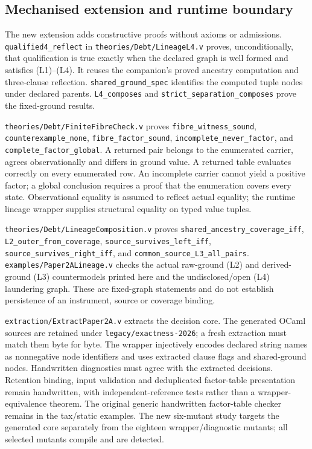 \documentclass[11pt]{article}
\theoremstyle{definition}
\newcommand{\code}[1]{\texttt{#1}}
\begin{document}
\subsection{Mechanised extension and runtime boundary}\label{ex:app:mechanisation}
The new extension adds constructive proofs without axioms or admissions. \code{qualified4\_reflect} in \nolinkurl{theories/Debt/LineageL4.v} proves, unconditionally, that qualification is true exactly when the declared graph is well formed and satisfies (L1)--(L4). It reuses the companion's proved ancestry computation and three-clause reflection. \code{shared\_ground\_spec} identifies the computed tuple nodes under declared parents. \code{L4\_composes} and \code{strict\_separation\_composes} prove the fixed-ground results.

\nolinkurl{theories/Debt/FiniteFibreCheck.v} proves \code{fibre\_witness\_sound}, \code{counterexample\_none}, \code{fibre\_factor\_sound}, \code{incomplete\_never\_factor}, and \code{complete\_factor\_global}. A returned pair belongs to the enumerated carrier, agrees observationally and differs in ground value. A returned table evaluates correctly on every enumerated row. An incomplete carrier cannot yield a positive factor; a global conclusion requires a proof that the enumeration covers every state. Observational equality is assumed to reflect actual equality; the runtime lineage wrapper supplies structural equality on typed value tuples.

\nolinkurl{theories/Debt/LineageComposition.v} proves \code{shared\_ancestry\_coverage\_iff}, \code{L2\_outer\_from\_coverage}, \code{source\_survives\_left\_iff}, \code{source\_survives\_right\_iff}, and \code{common\_source\_L3\_all\_pairs}. \nolinkurl{examples/Paper2ALineage.v} checks the actual raw-ground (L2) and derived-ground (L3) countermodels printed here and the undisclosed/open (L4) laundering graph. These are fixed-graph statements and do not establish persistence of an instrument, source or coverage binding.

\nolinkurl{extraction/ExtractPaper2A.v} extracts the decision core. The generated OCaml sources are retained under \nolinkurl{legacy/exactness-2026}; a fresh extraction must match them byte for byte. The wrapper injectively encodes declared string names as nonnegative node identifiers and uses extracted clause flags and shared-ground nodes. Handwritten diagnostics must agree with the extracted decisions. Retention binding, input validation and deduplicated factor-table presentation remain handwritten, with independent-reference tests rather than a wrapper-equivalence theorem. The original generic handwritten factor-table checker remains in the tax/static examples. The new six-mutant study targets the generated core separately from the eighteen wrapper/diagnostic mutants; all selected mutants compile and are detected.
\end{document}
